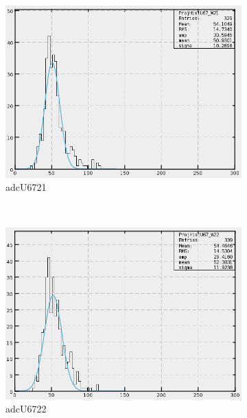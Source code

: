 \begin{figure}[h]
\begin{subfigure}[h]{0.3\textwidth}
        \includegraphics[width=\textwidth, keepaspectratio = true]{adcU67_21}
        \caption{adcU6721}
        \label{fig:adcU67_21}
    \end{subfigure}
    ~
    \begin{subfigure}[h]{0.3\textwidth}
        \centering
        \includegraphics[width=\textwidth, keepaspectratio = true]{adcU67_22}
        \caption{adcU6722}
        \label{fig:adcU67_22}
    \end{subfigure}
    \\
    \begin{subfigure}[h]{0.3\textwidth}
        \centering

\end{subfigure}
\end{figure}
